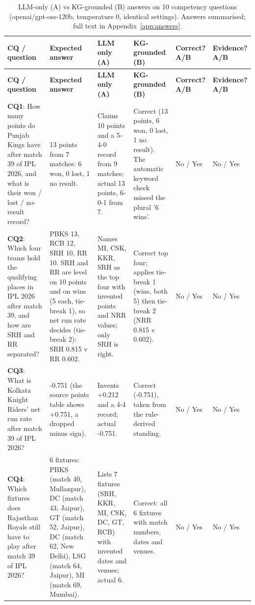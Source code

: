 {\footnotesize
\begin{longtable}{p{2.5cm}p{2.8cm}p{3.3cm}p{3.3cm}p{1.0cm}p{1.0cm}}
\caption{LLM-only (A) vs KG-grounded (B) answers on 10 competency questions (openai/gpt-oss-120b, temperature 0, identical settings). Answers summarised; full text in Appendix~\ref{app:answers}.}\label{tab:cq-eval}\\
\toprule \textbf{CQ / question} & \textbf{Expected answer} & \textbf{LLM only (A)} & \textbf{KG-grounded (B)} & \textbf{Correct? A/B} & \textbf{Evidence? A/B} \\ \midrule \endfirsthead
\toprule \textbf{CQ / question} & \textbf{Expected answer} & \textbf{LLM only (A)} & \textbf{KG-grounded (B)} & \textbf{Correct? A/B} & \textbf{Evidence? A/B} \\ \midrule \endhead
\bottomrule \endfoot
\textbf{CQ1}: How many points do Punjab Kings have after match 39 of IPL 2026, and what is their won / lost / no-result record? & 13 points from 7 matches: 6 won, 0 lost, 1 no result. & Claims 10 points and a 5-4-0 record from 9 matches; actual 13 points, 6-0-1 from 7. & Correct (13 points, 6 won, 0 lost, 1 no result). The automatic keyword check missed the plural '6 wins'. & No / Yes & No / Yes \\ \midrule
\textbf{CQ2}: Which four teams hold the qualifying places in IPL 2026 after match 39, and how are SRH and RR separated? & PBKS 13, RCB 12, SRH 10, RR 10. SRH and RR are level on 10 points and on wins (5 each, tie-break 1), so net run rate decides (tie-break 2): SRH 0.815 v RR 0.602. & Names MI, CSK, KKR, SRH as the top four with invented points and NRR values; only SRH is right. & Correct top four; applies tie-break 1 (wins, both 5) then tie-break 2 (NRR 0.815 v 0.602). & No / Yes & No / Yes \\ \midrule
\textbf{CQ3}: What is Kolkata Knight Riders' net run rate after match 39 of IPL 2026? & -0.751 (the source points table shows +0.751, a dropped minus sign). & Invents +0.212 and a 4-4 record; actual -0.751. & Correct (-0.751), taken from the rule-derived standing. & No / Yes & No / Yes \\ \midrule
\textbf{CQ4}: Which fixtures does Rajasthan Royals still have to play after match 39 of IPL 2026? & 6 fixtures: PBKS (match 40, Mullanpur), DC (match 43, Jaipur), GT (match 52, Jaipur), DC (match 62, New Delhi), LSG (match 64, Jaipur), MI (match 69, Mumbai). & Lists 7 fixtures (SRH, KKR, MI, CSK, DC, GT, RCB) with invented dates and venues; actual 6. & Correct: all 6 fixtures with match numbers, dates and venues. & No / Yes & No / Yes \\ \midrule

\end{longtable}}
